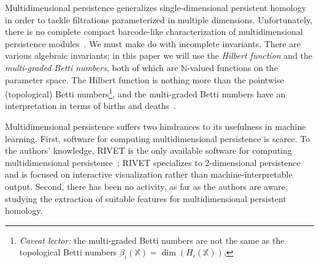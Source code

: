 \documentclass{article}
\begin{document}
Multidimensional persistence generalizes single-dimensional persistent homology
in order to tackle filtrations parameterized in multiple dimensions.
Unfortunately, there is no complete
compact barcode-like characterization of multidimensional persistence
modules~\cite{carlsson_theory_2009}. We must make do with incomplete invariants.
There are various algebraic invariants; in this paper we will use the
\textit{Hilbert function} and the \textit{multi-graded Betti numbers}, both of
which are $\mathbb{N}$-valued functions on the parameter space.
The Hilbert function is nothing more than the pointwise
(topological) Betti numbers\footnote{\textit{Caveat lector:} the multi-graded
Betti numbers are not the same as the topological Betti numbers
$\beta_i(\mathbb{X}) = \dim(H_i(\mathbb{X}))$.}, and the multi-graded Betti
numbers have an interpretation in terms of births and deaths~\cite{knudson_refinement_2008}.


Multidimensional persistence suffers two hindrances to its usefulness in
machine learning. First, software for computing multidimensional persistence is
scarce. To the authors' knowledge, RIVET is the only available software for
computing multidimensional persistence~\cite{lesnick_interactive_2015}; RIVET
specializes to $2$-dimensional persistence and is focused on interactive
visualization rather than machine-interpretable output.
Second, %
there has been no activity, as far as the authors are aware, studying the extraction
of suitable features for multidimensional persistent homology.
\end{document}
